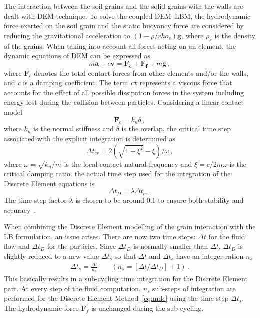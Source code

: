 The interaction between the soil grains and the solid grains with the walls are 
dealt with DEM technique. To solve the coupled DEM--LBM, the hydrodynamic force 
exerted on the soil grain and the static buoyancy force are considered by 
reducing the gravitational acceleration to $(1- \rho/rho_{s})\mathbf{g}$, where 
$\rho_{s}$ is the density of the grains. When taking into account all forces 
acting on an element, the dynamic equations of DEM can be expressed as
%
\begin{equation}
\label{eq:mde}
\mathit{m}\mathbf{a} +\mathit{c}\mathbf{v} = \mathbf{F_c} + \mathbf{F_f} 
+\mathit{m}\mathbf{g} \,,
\end{equation} 
%
\noindent where $\mathbf{F}_{c}$ denotes the total contact forces from other 
elements and/or the walls, and \textit{c} is a damping coefficient. The term 
\textit{c\textbf{v}} represents a viscous force that accounts for the effect of 
all possible dissipation forces in the system including energy lost during the 
collision between particles. Considering a linear contact model
%
\begin{equation}
\mathbf{F}_{c}=\mathit{k}_{\mathit{n}} \delta \,,
\end{equation}
%
\noindent where $\mathit{k}_{\mathit{n}}$ is the normal stiffness and $\delta$ 
is the overlap, the critical time step associated with the explicit integration 
is determined as~\citep{He1997}
%
\begin{equation}
\Delta t_{\mathit{cr}}= 2(\sqrt{1 + \xi^{2}}-\xi) / \omega \,,
\end{equation}
%
\noindent where $\omega = \sqrt{\mathit{k}_{\mathit{n}}/\mathit{m}}$ is the 
local contact natural frequency and $\xi = \mathit{c}/2\mathit{m}\omega$ is the 
critical damping ratio. the actual time step used for the integration of the 
Discrete Element equations is
%
\begin{equation}
\Delta \mathit{t}_{D}=\lambda \Delta \mathit{t}_{cr} \,.
\end{equation}
%
The time step factor $\lambda$ is chosen to be around 0.1 to ensure both 
stability and accuracy~\citep{He1997}.

When combining the Discrete Element modelling of the grain interaction with the 
LB formulation, an issue arises. There are now two time steps: $\Delta t$ for 
the fluid flow and $\Delta t_{D}$ for the particles. Since $\Delta t_{D}$ is 
normally smaller than $\Delta t$, $\Delta t_{D}$ is slightly reduced to a new 
value $\Delta t_{s}$ so that $\Delta t$ and $\Delta t_{s}$ have an integer 
ration $\mathit{n}_{\mathit{s}}$
%
\begin{align}
\Delta t_{s}=\frac{\Delta t}{\mathit{n}_{s}} \qquad(\mathit{n}_{s}=[\Delta t/ 
\Delta t_{D}]+1) \,.
\end{align} 
%
This basically results in a sub-cycling time integration for the Discrete 
Element part. At every step of the fluid computation, $\mathit{n}_{s}$ 
sub-steps of integration are performed for the Discrete Element 
Method~\eqref{eq:mde} using the time step $\Delta t_{s}$. The hydrodynamic 
force $\mathbf{F}_{f}$ is unchanged during the sub-cycling. 

